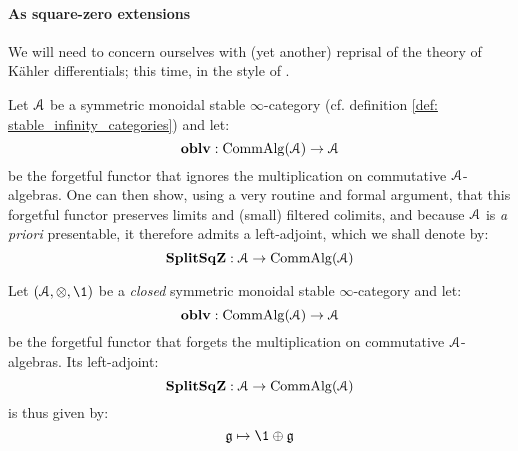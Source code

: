             \paragraph{As square-zero extensions}    
                We will need to concern ourselves with (yet another) reprisal of the theory of K\"ahler differentials; this time, in the style of \cite[Sections 7.3 and 7.4]{HA}.
                    
                    \begin{definition} \label{def: the_square_zero_extension_functor_existence}
                        Let $\mathcal{A}$ be a symmetric monoidal stable $\infty$-category (cf. definition \ref{def: stable_infinity_categories}) and let:
                            $$\mathbf{oblv}: \mathrm{Comm}\mathrm{Alg}(\mathcal{A}) \to \mathcal{A}$$
                        be the forgetful functor that ignores the multiplication on commutative $\mathcal{A}$-algebras. One can then show, using a very routine and formal argument, that this forgetful functor preserves limits and (small) filtered colimits, and because $\mathcal{A}$ is \textit{a priori} presentable, it therefore admits a left-adjoint, which we shall denote by:
                            $$\mathbf{Split}\mathbf{Sq}\mathbf{Z}: \mathcal{A} \to \mathrm{Comm}\mathrm{Alg}(\mathcal{A})$$
                    \end{definition}
                    \begin{proposition} \label{prop: the_square_zero_extension_functor_explicit_description}
                        Let $(\calA, \tensor, \1)$ be a \textit{closed} symmetric monoidal stable $\infty$-category and let:
                            $$\mathbf{oblv}: \mathrm{Comm}\mathrm{Alg}(\mathcal{A}) \to \mathcal{A}$$
                        be the forgetful functor that forgets the multiplication on commutative $\mathcal{A}$-algebras. Its left-adjoint:
                            $$\mathbf{Split}\mathbf{Sq}\mathbf{Z}: \mathcal{A} \to \mathrm{Comm}\mathrm{Alg}(\mathcal{A})$$
                        is thus given by:
                            $$\g \mapsto \1 \oplus \g$$
                    \end{proposition}
